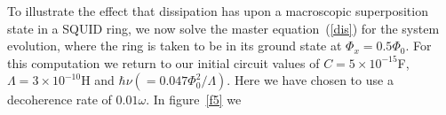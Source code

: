 \documentclass[12pt,a4paper,superscriptaddress,showpacs,floatfix,pra]{revtex4-2}
\begin{document}
To  illustrate the  effect  that dissipation  has  upon a  macroscopic
superposition  state  in  a  SQUID  ring,  we  now  solve  the  master
equation~(\ref{dis}) for the system evolution, where the ring is taken
to  be in  its  ground state  at  $\Phi _{x}=0.5\Phi  _{0}$. For  this
computation  we return  to our  initial circuit  values  of $C=5\times
10^{-15}$\textrm{F}, $\Lambda  =3\times 10^{-10}$\textrm{H} and $\hbar
\nu \left( =0.047\Phi _{0}^{2}/\Lambda  \right) $. Here we have chosen
to use a decoherence rate of $0.01\omega $.  In figure~\ref{f5} we
\begin{figure}[!t]
\begin{center}

\end{center}
\end{figure}
\end{document}
